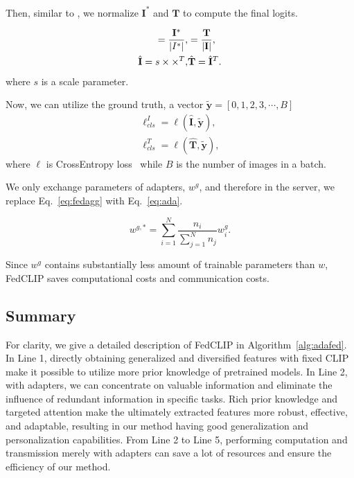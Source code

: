 \documentclass[11pt]{article}
\newcommand{\algorithmname}{Algorithm}
\newcommand{\equationname}{Eq.}
\newcommand{\method}{FedCLIP\xspace}
\newcommand{\wjd}[1]{{\color{cyan}{[(WJD): #1]}}}
\begin{document}
Then, similar to \cite{radford2021learning}, we normalize $\mathbf{I}^*$ and $\mathbf{T}$ to compute the final logits.

\begin{align}
    \title{\mathbf{I}} = \frac{\mathbf{I}^*}{|I^*|}, & \title{\mathbf{T}} = \frac{\mathbf{T}}{|\mathbf{I}|},\\
    \hat{\mathbf{I}}= s \times \title{\mathbf{I}} \times \title{\mathbf{T}}^T,&  \hat{\mathbf{T}}=\hat{\mathbf{I}}^T.
\end{align}
where $s$ is a scale parameter.

Now, we can utilize the ground truth, a vector $\tilde{\mathbf{y}}=[0,1,2,3,\cdots, B]$%
\begin{equation}
\begin{split}
        \ell_{cls}^I= \ell(\hat{\mathbf{I}},\tilde{\mathbf{y}}),\\
    \ell_{cls}^T= \ell(\hat{\mathbf{T}},\tilde{\mathbf{y}}),
\end{split}
\end{equation}
where $\ell$ is CrossEntropy loss~\cite{zhang2018generalized} while $B$ is the number of images in a batch.

We only exchange parameters of adapters, $w^g$, and therefore in the server, we replace \equationname~\ref{eq:fedagg} with \equationname~\ref{eq:ada}.

\begin{equation}
    w^{g,*}=\sum_{i=1}^N \frac{n_i}{\sum_{j=1}^N n_j} w_i^g.
    \label{eq:ada}
\end{equation}

Since $w^g$ contains substantially less amount of trainable parameters than $w$, \method saves computational costs and communication costs. 
\subsection{Summary}
For clarity, we give a detailed description of \method in \algorithmname~\ref{alg:adafed}.
In Line 1, directly obtaining generalized and diversified features with fixed CLIP make it possible to utilize more prior knowledge of pretrained models.
In Line 2, with adapters, we can concentrate on valuable information and eliminate the influence of redundant information in specific tasks.
Rich prior knowledge and targeted attention make the ultimately extracted features more robust, effective, and adaptable, resulting in our method having good generalization and personalization capabilities.
From Line 2 to Line 5, performing computation and transmission merely with adapters can save a lot of resources and ensure the efficiency of our method.
\end{document}
